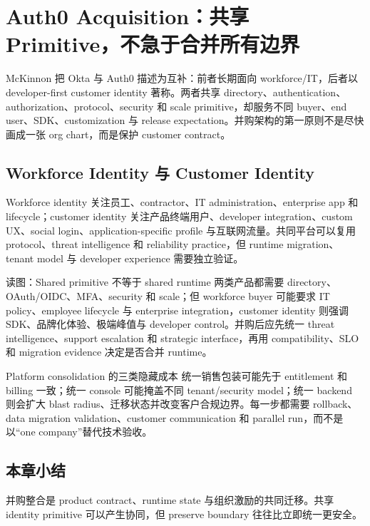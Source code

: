 \section{Auth0 Acquisition：共享 Primitive，不急于合并所有边界}

McKinnon 把 Okta 与 Auth0 描述为互补：前者长期面向 workforce/IT，后者以 developer-first customer identity 著称。两者共享 directory、authentication、authorization、protocol、security 和 scale primitive，却服务不同 buyer、end user、SDK、customization 与 release expectation。并购架构的第一原则不是尽快画成一张 org chart，而是保护 customer contract。

\subsection{Workforce Identity 与 Customer Identity}

Workforce identity 关注员工、contractor、IT administration、enterprise app 和 lifecycle；customer identity 关注产品终端用户、developer integration、custom UX、social login、application-specific profile 与互联网流量。共同平台可以复用 protocol、threat intelligence 和 reliability practice，但 runtime migration、tenant model 与 developer experience 需要独立验证。


\begin{knowledgebox}{读图：Shared primitive 不等于 shared runtime}
两类产品都需要 directory、OAuth/OIDC、MFA、security 和 scale；但 workforce buyer 可能要求 IT policy、employee lifecycle 与 enterprise integration，customer identity 则强调 SDK、品牌化体验、极端峰值与 developer control。并购后应先统一 threat intelligence、support escalation 和 strategic interface，再用 compatibility、SLO 和 migration evidence 决定是否合并 runtime。
\end{knowledgebox}


\begin{warningbox}{Platform consolidation 的三类隐藏成本}
统一销售包装可能先于 entitlement 和 billing 一致；统一 console 可能掩盖不同 tenant/security model；统一 backend 则会扩大 blast radius、迁移状态并改变客户合规边界。每一步都需要 rollback、data migration validation、customer communication 和 parallel run，而不是以“one company”替代技术验收。
\end{warningbox}

\subsection{本章小结}

并购整合是 product contract、runtime state 与组织激励的共同迁移。共享 identity primitive 可以产生协同，但 preserve boundary 往往比立即统一更安全。

